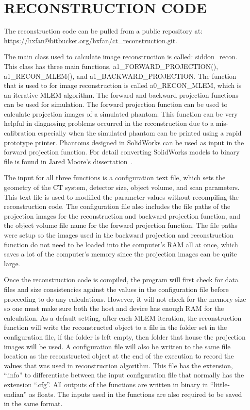 \chapter{RECONSTRUCTION CODE}\label{app:reconcode}
The reconstruction code can be pulled from a public repository at: \url{https://hxfan@bitbucket.org/hxfan/ct_reconstruction.git}.

The main class used to calculate image reconstruction is called: siddon\_recon.  This class has three main functions, a1\_FORWARD\_PROJECTION(), a1\_RECON\_MLEM(), and a1\_BACKWARD\_PROJECTION.  The function that is used to for image reconstruction is called a0\_RECON\_MLEM, which is an iterative MLEM algorithm.  The forward and backward projection functions can be used for simulation.  The forward projection function can be used to calculate projection images of a simulated phantom.  This function can be very helpful in diagnosing problems occurred in the reconstruction due to a mis-calibration especially when the simulated phantom can be printed using a rapid prototype printer.  Phantoms designed in SolidWorks can be used as input in the forward projection function.  For detail converting SolidWorks models to binary file is found in Jared Moore's dissertation~\citep{Moore2011}.

The input for all three functions is a configuration text file, which sets the geometry of the CT system, detector size, object volume, and scan parameters.  This text file is used to modified the parameter values without recompiling the reconstruction code.  The configuration file also includes the file paths of the projection images for the reconstruction and backward projection function, and the object volume file name for the forward projection function.  The file paths were setup so the images used in the backward projection and reconstruction function do not need to be loaded into the computer's RAM all at once, which saves a lot of the computer's memory since the projection images can be quite large.

Once the reconstruction code is compiled, the program will first check for data files and size consistencies against the values in the configuration file before proceeding to do any calculations.  However, it will not check for the memory size so one must make sure both the host and device has enough RAM for the calculation.  As a default setting, after each MLEM iteration, the reconstruction function will write the reconstructed object to a file in the folder set in the configuration file, if the folder is left empty, then folder that house the projection images will be used.  A configuration file will also be written to the same file location as the reconstructed object at the end of the execution to record the values that was used in reconstruction algorithm.  This file has the extension, ``.info'' to differentiate between the input configuration file that normally has the extension ``.cfg''.  All outputs of the functions are written in binary in ``little-endian'' as floats.  The inputs used in the functions are also required to be saved in the same format.

